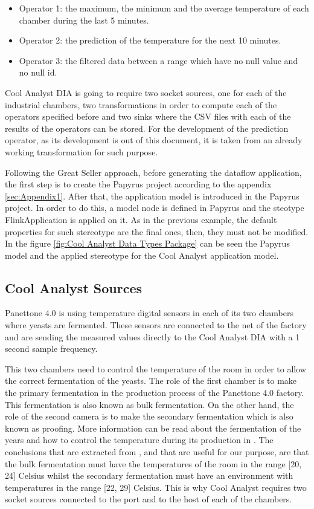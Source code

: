 \begin{itemize}
\item Operator 1: the maximum, the minimum and the average temperature of each chamber during the last 5 minutes.
\item Operator 2: the prediction of the temperature for the next 10 minutes.
\item Operator 3: the filtered data between a range which have no null value and no null id.
\end{itemize}

Cool Analyst DIA is going to require two socket sources, one for each of the industrial chambers, two transformations in order to compute each of the operators specified before and two sinks where the CSV files with each of the results of the operators can be stored. For the development of the prediction operator, as its development is out of this document, it is taken from an already working transformation for such purpose.

Following the Great Seller approach, before generating the dataflow application, the first step is to create the Papyrus project according to the appendix \ref{sec:Appendix1}. After that, the application model is introduced in the Papyrus project. In order to do this, a model node is defined in Papyrus and the steotype FlinkApplication is applied on it. As in the previous example, the default properties for such stereotype are the final ones, then, they must not be modified. In the figure \ref{fig:Cool Analyst Data Types Package} can be seen the Papyrus model and the applied stereotype for the Cool Analyst application model.

\subsection{Cool Analyst Sources}

Panettone 4.0 is using temperature digital sensors in each of its two chambers where yeasts are fermented. These sensors are connected to the net of the factory and are sending the measured values directly to the Cool Analyst DIA with a 1 second sample frequency.

This two chambers need to control the temperature of the room in order to allow the correct fermentation of the yeasts. The role of the first chamber is to make the primary fermentation in the production process of the Panettone 4.0 factory. This fermentation is also known as bulk fermentation. On the other hand, the role of the second camera is to make the secondary fermentation which is also known as proofing. More information can be read about the fermentation of the years and how to control the temperature during its production in \cite{yeastfermentation}. The conclusions that are extracted from \cite{yeastfermentation}, and that are useful for our purpose, are that the bulk fermentation must have the temperatures of the room in the range [20, 24] Celsius whilst the secondary fermentation must have an environment with temperatures in the range [22, 29] Celsius. This is why Cool Analyst requires two socket sources connected to the port and to the host of each of the chambers.

